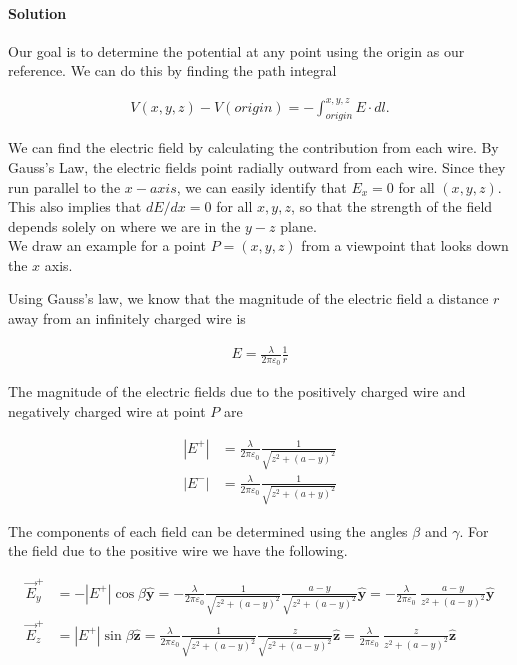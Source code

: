 \documentclass{article}
\newcommand{\bvec}[1]{\mathbf{\hat{#1}}}
\begin{document}
\paragraph{Solution} Our goal is to determine the potential at any point using the origin as our reference. We can do this by finding the path integral 

\begin{align*}
    V(x, y, z) - V(origin) = -\int_{origin}^{x, y, z} E\cdot dl.
\end{align*}

We can find the electric field by calculating the contribution from each wire. By Gauss's Law, the electric fields point radially outward from each wire. Since they run parallel to the $x-axis$, we can easily identify that $E_x = 0$ for all $(x, y, z)$.  This also implies that $dE/dx = 0$ for all $x, y, z$, so that the strength of the field depends solely on where we are in the $y-z$ plane.\\
\newpage
We draw an example for a point $P = (x, y, z)$ from a viewpoint that looks down the $x$ axis. 



Using Gauss's law, we know that the magnitude of the electric field a distance $r$ away from an infinitely charged wire is 

\begin{align*}
    E = \frac{\lambda}{2\pi\varepsilon_0}\frac{1}{r}
\end{align*}

The magnitude of the electric fields due to the positively charged wire and negatively charged wire at point $P$ are 

\begin{align*}
    |E^+| &= \frac{\lambda}{2\pi\varepsilon_0}\frac{1}{\sqrt{z^2 + (a - y)^2}} \\
    |E^-| &= \frac{\lambda}{2\pi\varepsilon_0}\frac{1}{\sqrt{z^2 + (a + y)^2}}
\end{align*}

The components of each field can be determined using the angles $\beta$ and $\gamma$. For the field due to the positive wire we have the following. 

\begin{align*}
    \vec{E}^+_y &= -|E^+|\cos{\beta}\bvec{y} = -\frac{\lambda}{2\pi\varepsilon_0}\frac{1}{\sqrt{z^2 + (a - y)^2}} \frac{a - y}{\sqrt{z^2 + (a - y)^2}} \bvec{y}
    = -\frac{\lambda}{2\pi\varepsilon_0}\ \frac{a - y}{z^2 + (a - y)^2}\bvec{y}\\
    \vec{E}^+_z &= |E^+|\sin{\beta}\bvec{z} = \frac{\lambda}{2\pi\varepsilon_0}\frac{1}{\sqrt{z^2 + (a - y)^2}} \frac{z}{\sqrt{z^2 + (a - y)^2}}\bvec{z} 
    = \frac{\lambda}{2\pi\varepsilon_0}\ \frac{z}{z^2 + (a - y)^2}
    \bvec{z}
\end{align*}
\newpage
\end{document}
